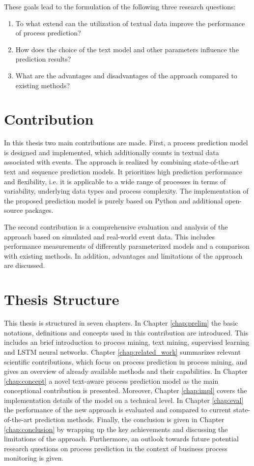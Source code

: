 These goals lead to the formulation of the following three research questions:

\begin{enumerate}
	\item To what extend can the utilization of textual data improve the performance of process prediction?
	\item How does the choice of the text model and other parameters influence the prediction results?
	\item What are the advantages and disadvantages of the approach compared to existing methods?
\end{enumerate}



\section{Contribution}

In this thesis two main contributions are made.
First, a process prediction model is designed and implemented, which additionally counts in textual data associated with events.
The approach is realized by combining state-of-the-art text and sequence prediction models.
It prioritizes high prediction performance and flexibility, i.e. it is applicable to a wide range of processes in terms of variability, underlying data types and process complexity.
The implementation of the proposed prediction model is purely based on Python and additional open-source packages.

The second contribution is a comprehensive evaluation and analysis of the approach based on simulated and real-world event data.
This includes performance measurements of differently parameterized models and a comparison with existing methods.
In addition, advantages and limitations of the approach are discussed.

\section{Thesis Structure}

This thesis is structured in seven chapters.
In Chapter \ref{chap:prelim} the basic notations, definitions and concepts used in this contribution are introduced.
This includes an brief introduction to process mining, text mining, supervised learning and LSTM neural networks.
Chapter \ref{chap:related_work} summarizes relevant scientific contributions, which focus on process prediction in process mining, and gives an overview of already available methods and their capabilities.
In Chapter \ref{chap:concept} a novel text-aware process prediction model as the main conceptional contribution is presented.
Moreover, Chapter \ref{chap:impl} covers the implementation details of the model on a technical level.
In Chapter \ref{chap:eval} the performance of the new approach is evaluated and compared to current state-of-the-art prediction methods.
Finally, the conclusion is given in Chapter \ref{chap:conclusion} by wrapping up the key achievements and discussing the limitations of the approach.
Furthermore, an outlook towards future potential research questions on process prediction in the context of business process monitoring is given.